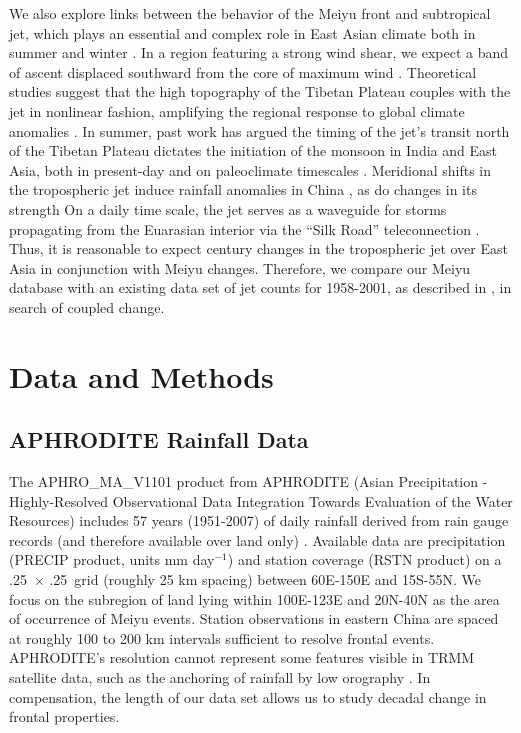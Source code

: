 \documentclass[draft,grl]{AGUTeX}
\begin{document}
\begin{article}
	We also explore links between the behavior of the Meiyu front and subtropical jet, which plays an essential and complex role in East Asian climate both in summer and winter \citep{Yang2002}. In a region featuring a strong wind shear, we expect a band of ascent displaced southward from the core of maximum wind \citep{Holton2004}. Theoretical studies suggest that the high topography of the Tibetan Plateau couples with the jet in nonlinear fashion, amplifying the regional response to global climate anomalies \citep{Nigam1989,Broccoli1992,Park1997}. In summer, past work has argued the timing of the jet's transit north of the Tibetan Plateau dictates the initiation of the monsoon in India and East Asia, both in present-day \citep{Yin1949,Hahn1975,Yeh1959} and on paleoclimate timescales \citep{Nagashima2011,Nagashima2013,Chiang2015}. Meridional shifts in the tropospheric jet induce rainfall anomalies in China \citep{Liang1998}, as do changes in its strength \citep{Kwon2007,Du2009,Li2014} On a daily time scale, the jet serves as a waveguide for storms propagating from the Euarasian interior via the ``Silk Road'' teleconnection \citep{Hoskins1993,Ambrizzi1997,Kosaka2012}. Thus, it is reasonable to expect  century changes in the tropospheric jet over East Asia in conjunction with Meiyu changes. Therefore, we compare our Meiyu database with an existing data set of jet counts for 1958-2001, as described in \citet{Schiemann2009}, in search of coupled change.
	
\section{Data and Methods}

\subsection{APHRODITE Rainfall Data}

	The APHRO\_MA\_V1101 product from APHRODITE (Asian Precipitation - Highly-Resolved Observational Data Integration Towards Evaluation of the Water Resources) includes 57 years (1951-2007) of daily  rainfall derived from rain gauge records (and therefore available over land only) \citep{Yatagai2012} . Available data are precipitation (PRECIP product, units mm day$^{-1}$) and station coverage (RSTN product) on a .25\textdegree\ $\times$ .25\textdegree\ grid (roughly 25 km spacing) between 60\textdegree E-150\textdegree E and 15\textdegree S-55\textdegree N. We focus on the subregion of land lying within 100\textdegree E-123\textdegree E and 20\textdegree N-40\textdegree N as the area of occurrence of Meiyu events. Station observations in eastern China are spaced at roughly 100 to 200 km intervals sufficient to resolve frontal events. APHRODITE's resolution cannot represent some features visible in TRMM satellite data, such as the anchoring of rainfall by low orography \citep{Xu2009}. In compensation, the length of our data set allows us to study decadal change in frontal properties. 
	

\end{article}
\end{document}
